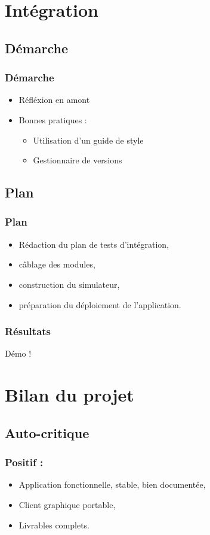 \documentclass{beamer}
\begin{document}
\section{Intégration}
	\subsection{Démarche}
	\begin{frame}
		\frametitle{Démarche}
		\begin{itemize}
			\item Réfléxion en amont
			\item Bonnes pratiques :
			\begin{itemize}
				\item Utilisation d'un guide de style
				\item Gestionnaire de versions
			\end{itemize}
		\end{itemize}
	\end{frame}

	\subsection{Plan}
	\begin{frame}
		\frametitle{Plan}
		\begin{itemize}
			\item Rédaction du plan de tests d'intégration,
			\item câblage des modules,
			\item construction du simulateur,
			\item préparation du déploiement de l'application.
		\end{itemize}
	\end{frame}

	\begin{frame}
		\frametitle{Résultats}
		Démo !
	\end{frame}

\section{Bilan du projet}
	\subsection{Auto-critique}
	\begin{frame}
	\frametitle{Positif :}
	\begin{itemize}
		\item Application fonctionnelle, stable, bien documentée,
		\item Client graphique portable,
		\item Livrables complets.
	\end{itemize}
	\end{frame}
\end{document}
